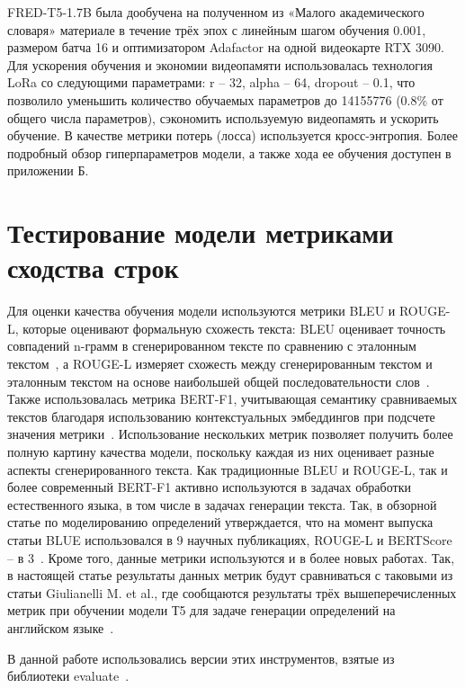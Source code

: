 \documentclass[LI,VKR]{HSEUniversity}
\begin{document}
FRED-T5-1.7B была дообучена на полученном из «Малого академического словаря» материале
в течение трёх эпох с линейным шагом обучения 0.001,
размером батча 16 и оптимизатором Adafactor на одной видеокарте RTX 3090.
Для ускорения обучения и экономии видеопамяти использовалась технология LoRa со
следующими параметрами: r – 32, alpha – 64, dropout – 0.1, что позволило
уменьшить количество обучаемых параметров до 14155776 (0.8\% от общего числа параметров),
сэкономить используемую видеопамять и ускорить обучение.
В качестве метрики потерь (лосса) используется кросс-энтропия. %
Более подробный обзор гиперпараметров модели, а также хода ее обучения доступен в приложении Б.

\section{Тестирование модели метриками сходства строк}

Для оценки качества обучения модели используются метрики BLEU и ROUGE-L,
которые оценивают формальную схожесть текста: BLEU оценивает точность совпадений n-грамм
в сгенерированном тексте по сравнению с эталонным текстом~\cite{BLUE}, а ROUGE-L измеряет схожесть между
сгенерированным текстом и эталонным текстом на основе наибольшей общей последовательности слов~\cite{ROUGE}.
Также использовалась метрика BERT-F1, учитывающая семантику сравниваемых текстов благодаря
использованию контекстуальных эмбеддингов при подсчете значения метрики~\cite{BERTScore}.
Использование нескольких метрик позволяет получить более полную картину качества модели,
поскольку каждая из них оценивает разные аспекты сгенерированного текста.
Как традиционные BLEU и ROUGE-L, так и более современный BERT-F1 активно используются в
задачах обработки естественного языка, в том числе в задачах генерации текста.
Так, в обзорной статье по моделированию определений утверждается, что на момент выпуска статьи BLUE
использовался в 9 научных публикациях, ROUGE-L и BERTScore – в 3~\cite{DefinitionModelingReviewAndDatasetAnalysis}.
Кроме того, данные метрики используются и в более новых работах.
Так, в настоящей статье результаты данных метрик будут сравниваться с таковыми из статьи
Giulianelli M. et al., где сообщаются результаты трёх вышеперечисленных метрик при обучении модели
Т5 для задаче генерации определений на английском языке~\cite{DefinitionGenerationMainArticle}.

В данной работе использовались версии этих инструментов, взятые из библиотеки evaluate~\cite{Evaluate}.
\end{document}
